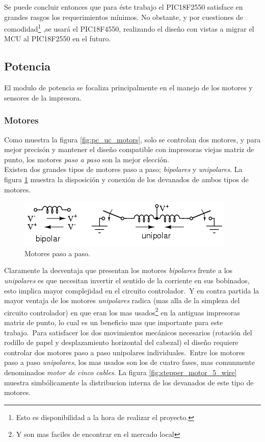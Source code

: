 Se puede concluir entonces que para \'este trabajo el PIC18F2550 satisface en
grandes rasgos los requerimientos m\'inimos. No obstante, y por cuestiones de
comodidad\footnote{Esto es disponibilidad a la hora de realizar el proyecto.}
,se usar\'a el PIC18F4550, realizando el dise\~no con vistas a migrar el MCU
al PIC18F2550 en el futuro.\\



\subsection{Potencia}
%
El modulo de potencia se focaliza principalmente en el manejo de los motores y
sensores de la impresora.

\subsubsection{Motores}
%
Como muestra la figura \ref{fig:pc_uc_motors}, solo se controlan dos motores, y
para mejor precis\'on y mantener el dise\~no compatible con impresoras viejas
matriz de punto, los motores \emph{paso a paso} son la mejor elecci\'on.\\

Existen dos grandes tipos de motores paso a paso; \emph{bipolares} y
\emph{unipolares}. La figura \ref{fig:stepper_motors} muestra la disposici\'on
y conexi\'on de los devanados de ambos tipos de motores. 


\begin{figure}[htp]
\centering
\includegraphics[scale=0.7]{./img/02440.png}
\caption{Motores paso a paso.}
\label{fig:stepper_motors}
\end{figure}

Claramente la desventaja que presentan los motores \emph{bipolares} frente a
los \emph{unipolares} es que necesitan invertir el sentido de la corriente en
sus bobinados, esto implica mayor complejidad en el circuito controlador.\
Y en contra partida la mayor ventaja de los motores \emph{unipolares} radica
(mas alla de la simpleza del circuito controlador) en que eran los mas
usados\footnote{Y son mas faciles de encontrar en el mercado local} en la
antiguas impresoras matriz de punto, lo cual es un beneficio mas que importante
para este trabajo.\
Para satisfacer los dos movimientos mec\'anicos necesarios (rotaci\'on del
rodillo de papel y desplazamiento horizontal del cabezal) el dise\~no requiere
controlar dos motores paso a paso unipolares individuales.\
Entre los motores paso a paso \emph{unipolares}, los mas usados son los de
cuatro fases, mas comunmente denominados \emph{motor de cinco cables}. La
figura \ref{fig:stepper_motor_5_wire} muestra simb\'olicamente la distribucion
interna de los devanados de este tipo de motores.

